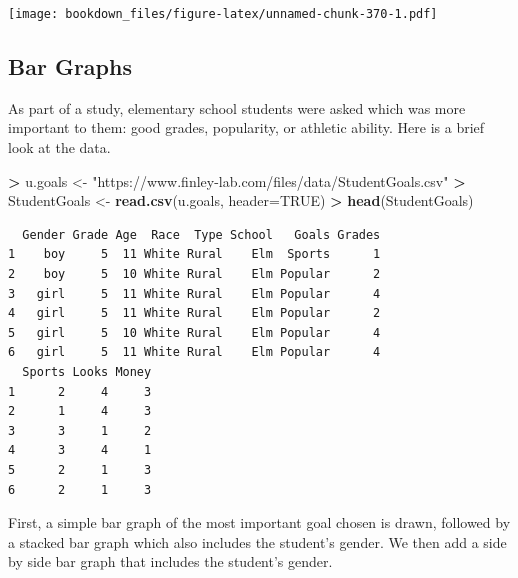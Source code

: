 \documentclass[
]{krantz}
\makeatletter
\newenvironment{Shaded}{\begin{snugshade}}{\end{snugshade}}
\newcommand{\DataTypeTok}[1]{\textcolor[rgb]{0.27,0.27,0.27}{#1}}
\newcommand{\KeywordTok}[1]{\textcolor[rgb]{0.27,0.27,0.27}{\textbf{#1}}}
\newcommand{\NormalTok}[1]{#1}
\newcommand{\OperatorTok}[1]{\textcolor[rgb]{0.43,0.43,0.43}{\textbf{#1}}}
\newcommand{\OtherTok}[1]{\textcolor[rgb]{0.37,0.37,0.37}{#1}}
\newcommand{\StringTok}[1]{\textcolor[rgb]{0.5,0.5,0.5}{#1}}
\newenvironment{kframe}{%
\medskip{}
\setlength{\fboxsep}{.8em}
 \def\at@end@of@kframe{}%
 \ifinner\ifhmode%
  \def\at@end@of@kframe{\end{minipage}}%
  \begin{minipage}{\columnwidth}%
 \fi\fi%
 \def\FrameCommand##1{\hskip\@totalleftmargin \hskip-\fboxsep
 \colorbox{shadecolor}{##1}\hskip-\fboxsep
     \hskip-\linewidth \hskip-\@totalleftmargin \hskip\columnwidth}%
 \MakeFramed {\advance\hsize-\width
   \@totalleftmargin\z@ \linewidth\hsize
   \@setminipage}}%
 {\par\unskip\endMakeFramed%
 \at@end@of@kframe}
\renewenvironment{Shaded}{\begin{kframe}}{\end{kframe}}
\makeatother
\begin{document}
\texttt{[image: bookdown\_files/figure-latex/unnamed-chunk-370-1.pdf]}

\hypertarget{bar-graphs-1}{%
\subsection{Bar Graphs}\label{bar-graphs-1}}

As part of a study, elementary school students were asked which was more important to them: good grades, popularity, or athletic ability. Here is a brief look at the data.

\begin{Shaded}
\begin{Highlighting}[]
\OperatorTok{\textgreater{}}\StringTok{ }\NormalTok{u.goals \textless{}{-}}\StringTok{ "https://www.finley{-}lab.com/files/data/StudentGoals.csv"}
\OperatorTok{\textgreater{}}\StringTok{ }\NormalTok{StudentGoals \textless{}{-}}\StringTok{ }\KeywordTok{read.csv}\NormalTok{(u.goals, }\DataTypeTok{header=}\OtherTok{TRUE}\NormalTok{)}
\OperatorTok{\textgreater{}}\StringTok{ }\KeywordTok{head}\NormalTok{(StudentGoals)}
\end{Highlighting}
\end{Shaded}

\begin{verbatim}
  Gender Grade Age  Race  Type School   Goals Grades
1    boy     5  11 White Rural    Elm  Sports      1
2    boy     5  10 White Rural    Elm Popular      2
3   girl     5  11 White Rural    Elm Popular      4
4   girl     5  11 White Rural    Elm Popular      2
5   girl     5  10 White Rural    Elm Popular      4
6   girl     5  11 White Rural    Elm Popular      4
  Sports Looks Money
1      2     4     3
2      1     4     3
3      3     1     2
4      3     4     1
5      2     1     3
6      2     1     3
\end{verbatim}

First, a simple bar graph of the most important goal chosen is drawn, followed by a stacked bar graph which also includes the student's gender. We then add a side by side bar graph that includes the student's gender.

\begin{Shaded}
\end{Shaded}
\end{document}
